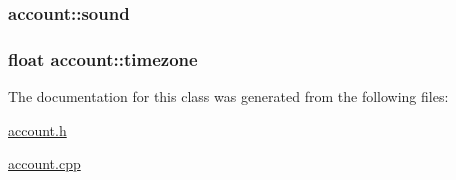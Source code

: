 \hypertarget{classaccount_abfa6841eb5aa7765512ce8ca2e15c2d5}{
\subsubsection[{sound}]{ account\-::sound}}\label{classaccount_abfa6841eb5aa7765512ce8ca2e15c2d5}
\hypertarget{classaccount_a7eb216076728b85fb3ce1dc89b794f87}{
\subsubsection[{timezone}]{\setlength{\rightskip}{0pt plus 5cm}float account\-::timezone}}\label{classaccount_a7eb216076728b85fb3ce1dc89b794f87}


The documentation for this class was generated from the following files\-:\begin{DoxyCompactItemize}
\item 
\hyperlink{account_8h}{account.\-h}\item 
\hyperlink{account_8cpp}{account.\-cpp}\end{DoxyCompactItemize}

